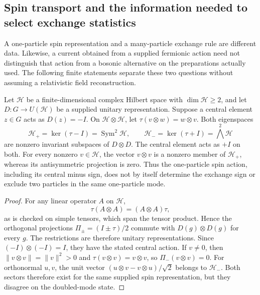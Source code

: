 \subsection{Spin transport and the information needed to select exchange statistics}
\label{sec:spin-exchange-selection-boundary}

A one-particle spin representation and a many-particle exchange rule are
different data. Likewise, a current obtained from a supplied fermionic
action need not distinguish that action from a bosonic alternative on the
preparations actually used. The following finite statements separate these
two questions without assuming a relativistic field reconstruction.

\begin{proposition}
\label{prop:spin-exchange-sector-boundary}
Let $\mathcal H$ be a finite-dimensional complex Hilbert space with
$\dim\mathcal H\geq2$, and let $D:G\to U(\mathcal H)$ be a supplied
unitary representation. Suppose a central element $z\in G$ acts as
$D(z)=-I$. On $\mathcal H\otimes\mathcal H$, let
$\tau(v\otimes w)=w\otimes v$. Both eigenspaces
\[
 \mathcal H_+=\ker(\tau-I)=\operatorname{Sym}^2\mathcal H,
 \qquad
 \mathcal H_-=\ker(\tau+I)=\bigwedge^2\mathcal H
\]
are nonzero invariant subspaces of $D\otimes D$. The central element acts
as $+I$ on both. For every nonzero $v\in\mathcal H$, the vector
$v\otimes v$ is a nonzero member of $\mathcal H_+$, whereas its
antisymmetric projection is zero. Thus the one-particle spin action,
including its central minus sign, does not by itself determine the
exchange sign or exclude two particles in the same one-particle mode.
\end{proposition}
\begin{proof}
For any linear operator $A$ on $\mathcal H$,
\[
 \tau(A\otimes A)=(A\otimes A)\tau,
\]
as is checked on simple tensors, which span the tensor product. Hence
the orthogonal projections $\Pi_\pm=(I\pm\tau)/2$ commute with
$D(g)\otimes D(g)$ for every $g$. The restrictions are therefore unitary
representations. Since $(-I)\otimes(-I)=I$, they have the stated central
action. If $v\ne0$, then $\|v\otimes v\|=\|v\|^2>0$ and
$\tau(v\otimes v)=v\otimes v$, so $\Pi_-(v\otimes v)=0$.
For orthonormal $u,v$, the unit vector
$(u\otimes v-v\otimes u)/\sqrt2$ belongs to $\mathcal H_-$.
Both sectors therefore exist for the same supplied spin representation,
but they disagree on the doubled-mode state.
\end{proof}

